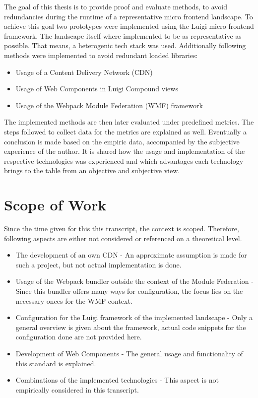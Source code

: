 The goal of this thesis is to provide proof and evaluate methods, to avoid redundancies during the runtime of a representative micro frontend landscape. To achieve this goal two prototypes were implemented using the Luigi micro frontend framework. The landscape itself where implemented to be as representative as possible. That means, a heterogenic tech stack was used. Additionally following methods were implemented to avoid redundant loaded libraries:

\begin{itemize}
	\item Usage of a Content Delivery Network (CDN)
	\item Usage of Web Components in Luigi Compound views
	\item Usage of the Webpack Module Federation (WMF) framework
\end{itemize}

The implemented methods are then later evaluated under predefined metrics. The steps followed to collect data for the metrics are explained as well.
Eventually a conclusion is made based on the empiric data, accompanied by the subjective experience of the author. It is shared how the usage and implementation of the respective technologies was experienced and which advantages each technology brings to the table from an objective and subjective view.
  
\section{Scope of Work}

Since the time given for this this transcript, the context is scoped. Therefore, following aspects are either not considered or referenced on a theoretical level.

\begin{itemize}
	\item The development of an own CDN - An approximate assumption is made for such a project, but not actual implementation is done.
	\item Usage of the Webpack bundler outside the context of the Module Federation - Since this bundler offers many ways for configuration, the focus lies on the necessary onces for the WMF context.
	\item Configuration for the Luigi framework of the implemented landscape - Only a general overview is given about the framework, actual code snippets for the configuration done are not provided here.
	\item Development of Web Components - The general usage and functionality of this standard is explained.
	\item Combinations of the implemented technologies - This aspect is not empirically considered in this transcript.
\end{itemize}

